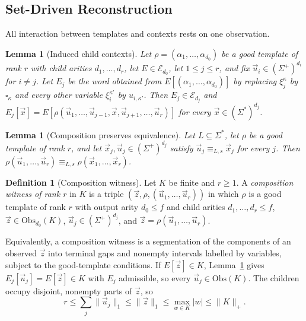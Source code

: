 \documentclass[11pt]{article}
\numberwithin{equation}{section}
\theoremstyle{plain}
\newtheorem{lemma}[theorem]{Lemma}
\theoremstyle{definition}
\newtheorem{definition}[theorem]{Definition}
\theoremstyle{remark}
\newcommand{\tuple}[1]{\vec{#1}}
\newcommand{\blank}{\square}
\theoremstyle{plain}
\begin{document}
\subsection{Set-Driven Reconstruction}

All interaction between templates and contexts rests on one observation.

\begin{lemma}[Induced child contexts]
\label{lem:filling-identity}
Let $\rho=(\alpha_1,\ldots,\alpha_{d_0})$ be a good template of rank $r$ with child
arities $d_1,\ldots,d_r$, let $E\in\mathcal E_{d_0}$, let $1\le j\le r$, and fix
$\tuple u_i\in(\Sigma^+)^{d_i}$ for $i\ne j$.  Let $E_j$ be the word obtained
from $E[(\alpha_1,\ldots,\alpha_{d_0})]$ by replacing $\xi_j^\kappa$ by
$\blank_\kappa$ and every other variable $\xi_i^{\kappa'}$ by $u_{i,\kappa'}$.  Then
$E_j\in\mathcal E_{d_j}$ and
$E_j[\tuple x]=E[\rho(\tuple u_1,\ldots,\tuple u_{j-1},\tuple x,
\tuple u_{j+1},\ldots,\tuple u_r)]$ for every
$\tuple x\in(\Sigma^*)^{d_j}$.
\end{lemma}

\begin{lemma}[Composition preserves equivalence]
\label{lem:witnessed-composition}
Let $L\subseteq\Sigma^*$, let $\rho$ be a good template of rank $r$, and let
$\tuple x_j,\tuple u_j\in(\Sigma^+)^{d_j}$ satisfy
$\tuple u_j\equiv_{L,s}\tuple x_j$ for every $j$.  Then
$\rho(\tuple u_1,\ldots,\tuple u_r)\equiv_{L,s}\rho(\tuple x_1,\ldots,\tuple x_r)$.
\end{lemma}

\begin{definition}[Composition witness]
\label{def:composition-witness}
Let $K$ be finite and $r\ge1$.  A \emph{composition witness of rank $r$} in $K$
is a triple $(\tuple z,\rho,(\tuple u_1,\ldots,\tuple u_r))$ in which $\rho$
is a good template of rank $r$ with output arity $d_0\le f$ and child arities
$d_1,\ldots,d_r\le f$, $\tuple z\in\mathrm{Obs}_{d_0}(K)$,
$\tuple u_j\in(\Sigma^+)^{d_j}$, and
$\tuple z=\rho(\tuple u_1,\ldots,\tuple u_r)$.
\end{definition}

Equivalently, a composition witness is a segmentation of the components of an
observed $\tuple z$ into terminal gaps and nonempty intervals labelled by
variables, subject to the good-template conditions.  If $E[\tuple z]\in K$,
Lemma~\ref{lem:filling-identity} gives $E_j[\tuple u_j]=E[\tuple z]\in K$ with
$E_j$ admissible, so every $\tuple u_j\in\mathrm{Obs}(K)$.  The children occupy
disjoint, nonempty parts of $\tuple z$, so
\begin{equation}
\label{eq:sample-rank}
 r\le\textstyle\sum_j\|\tuple u_j\|_1\le\|\tuple z\|_1\le\max_{w\in K}|w|
 \le\|K\|_+ .
\end{equation}
\end{document}
